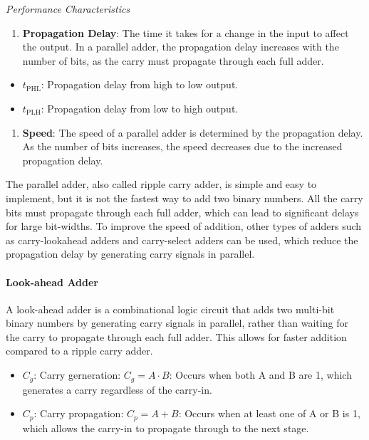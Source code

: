 \documentclass[
  a4paper,
]{article}
\providecommand{\tightlist}{%
  \setlength{\itemsep}{0pt}\setlength{\parskip}{0pt}}
\begin{document}
\emph{Performance Characteristics}

\begin{enumerate}
\def\labelenumi{\arabic{enumi}.}
\tightlist
\item
  \textbf{Propagation Delay}: The time it takes for a change in the
  input to affect the output. In a parallel adder, the propagation delay
  increases with the number of bits, as the carry must propagate through
  each full adder.
\end{enumerate}

\begin{itemize}
\tightlist
\item
  \(t_{\text{PHL}}\): Propagation delay from high to low output.
\item
  \(t_{\text{PLH}}\): Propagation delay from low to high output.
\end{itemize}

\begin{enumerate}
\def\labelenumi{\arabic{enumi}.}
\setcounter{enumi}{1}
\tightlist
\item
  \textbf{Speed}: The speed of a parallel adder is determined by the
  propagation delay. As the number of bits increases, the speed
  decreases due to the increased propagation delay.
\end{enumerate}

The parallel adder, also called ripple carry adder, is simple and easy
to implement, but it is not the fastest way to add two binary numbers.
All the carry bits must propagate through each full adder, which can
lead to significant delays for large bit-widths. To improve the speed of
addition, other types of adders such as carry-lookahead adders and
carry-select adders can be used, which reduce the propagation delay by
generating carry signals in parallel.

\paragraph{Look-ahead Adder}\label{look-ahead-adder}

A look-ahead adder is a combinational logic circuit that adds two
multi-bit binary numbers by generating carry signals in parallel, rather
than waiting for the carry to propagate through each full adder. This
allows for faster addition compared to a ripple carry adder.

\begin{itemize}
\item
  \(C_g\): Carry gerneration: \(C_g = A \cdot B\): Occurs when both A
  and B are 1, which generates a carry regardless of the carry-in.
\item
  \(C_p\): Carry propagation: \(C_p = A + B\): Occurs when at least one
  of A or B is 1, which allows the carry-in to propagate through to the
  next stage.
\end{itemize}
\end{document}
